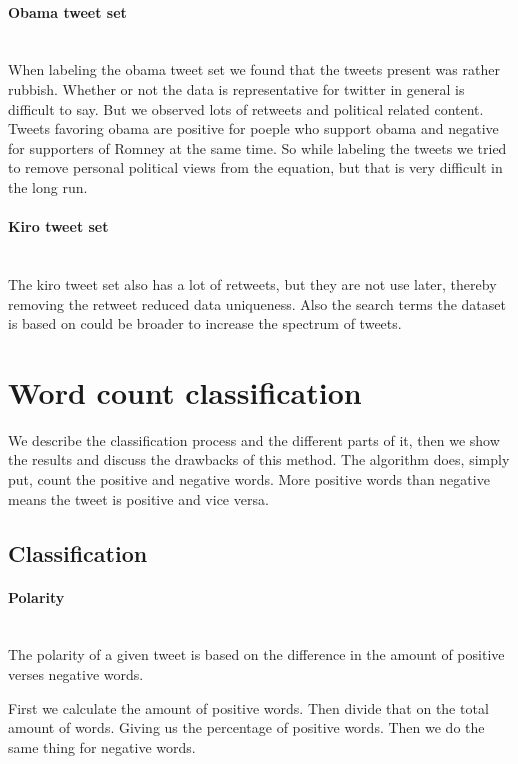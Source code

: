 \paragraph{Obama tweet set}
\hspace{0pt}\\
When labeling the obama tweet set we found that the tweets present was rather
rubbish. Whether or not the data is representative for twitter in general is
difficult to say. But we observed lots of retweets and political related
content. Tweets favoring obama are positive for poeple who support obama and
negative for supporters of Romney at the same time. So while labeling the
tweets we tried to remove personal political views from the equation, but that
is very difficult in the long run.  

\paragraph{Kiro tweet set}
\hspace{0pt}\\
The kiro tweet set also has a lot of retweets, but they are not use later,
thereby removing the retweet reduced data uniqueness. Also the search terms the
dataset is based on could be broader to increase the spectrum of tweets.  
%

\section{Word count classification}\label{sentiment:word_count_classification}
We describe the classification process and the different parts of it, then we
show the results and discuss the drawbacks of this method. The algorithm does,
simply put, count the positive and negative words. More positive words than
negative means the tweet is positive and vice versa. 

\subsection{Classification}
\paragraph{Polarity} 
\hspace{0pt}\\ 
The polarity of a given tweet is based on the difference in the amount of
positive verses negative words. 

First we calculate the amount of positive words. Then divide that on the total
amount of words. Giving us the percentage of positive words. Then we do the same thing for negative words.


